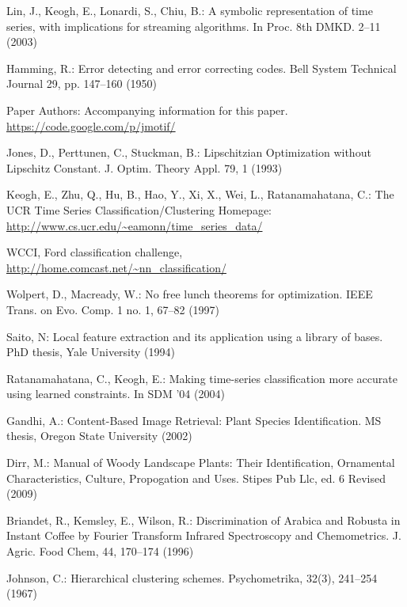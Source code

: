\documentclass[conference]{IEEEtran}
\begin{document}
\begin{thebibliography}{5}
Lin, J., Keogh, E., Lonardi, S., Chiu, B.:
A symbolic representation of time series, with implications for streaming algorithms. 
In Proc. 8th DMKD. 2--11 (2003)

Hamming, R.:
Error detecting and error correcting codes. 
Bell System Technical Journal 29, pp. 147--160 (1950)

Paper Authors:
Accompanying information for this paper. 
\url{https://code.google.com/p/jmotif/}

Jones, D., Perttunen, C., Stuckman, B.:
Lipschitzian Optimization without Lipschitz Constant.
J. Optim. Theory Appl. 79, 1 (1993)

Keogh, E., Zhu, Q., Hu, B., Hao, Y.,  Xi, X., Wei, L., Ratanamahatana, C.:
The UCR Time Series Classification/Clustering Homepage:
\url{http://www.cs.ucr.edu/~eamonn/time_series_data/}

WCCI, Ford classification challenge,
\url{http://home.comcast.net/~nn_classification/}

Wolpert, D., Macready, W.:
No free lunch theorems for optimization.
IEEE Trans. on Evo. Comp. 1 no. 1, 67--82 (1997)

Saito, N:
Local feature extraction and its application using a library of bases. 
PhD thesis, Yale University (1994)


Ratanamahatana, C., Keogh, E.:
Making time-series classification more accurate using learned constraints. 
In SDM '04 (2004)

Gandhi, A.:
Content-Based Image Retrieval: Plant Species Identification. 
MS thesis, Oregon State University (2002)

Dirr, M.:
Manual of Woody Landscape Plants: Their Identification, Ornamental Characteristics,
Culture, Propogation and Uses.
Stipes Pub Llc, ed. 6 Revised (2009)

Briandet, R., Kemsley, E., Wilson, R.:
Discrimination of Arabica and Robusta in Instant Coffee by Fourier Transform Infrared Spectroscopy
and Chemometrics.
J. Agric. Food Chem, 44, 170--174 (1996)

Johnson, C.:
Hierarchical clustering schemes.
Psychometrika, 32(3), 241--254 (1967)


\end{thebibliography}
\end{document}
